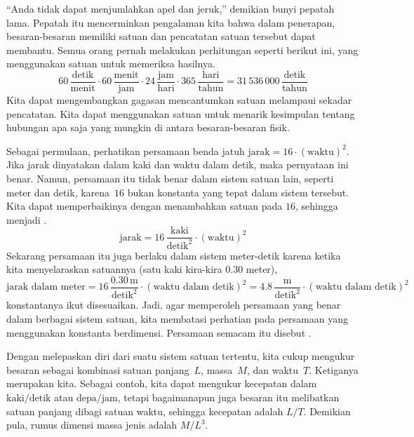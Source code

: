 ``Anda tidak dapat menjumlahkan apel dan jeruk,'' demikian bunyi pepatah lama.
Pepatah itu mencerminkan pengalaman kita bahwa dalam penerapan, besaran-besaran
memiliki satuan dan pencatatan satuan tersebut dapat membantu.
Semua orang pernah melakukan perhitungan seperti berikut ini,
yang menggunakan satuan untuk memeriksa hasilnya.
\begin{equation*}
  60\,\frac{\text{detik}}{\text{menit}}
  \cdot 60\,\frac{\text{menit}}{\text{jam}}
  \cdot 24\,\frac{\text{jam}}{\text{hari}}
  \cdot 365\,\frac{\text{hari}}{\text{tahun}}
  = 31\,536\,000\,\frac{\text{detik}}{\text{tahun}}
\end{equation*}
Kita dapat mengembangkan gagasan mencantumkan satuan melampaui sekadar pencatatan.
Kita dapat menggunakan satuan untuk menarik kesimpulan
tentang hubungan apa saja yang mungkin di antara besaran-besaran fisik.

Sebagai permulaan, perhatikan persamaan benda jatuh
$\text{jarak}=16\cdot(\text{waktu})^2$.
Jika jarak dinyatakan dalam kaki dan waktu dalam detik, maka pernyataan ini
benar.
Namun, persamaan itu tidak benar dalam sistem satuan lain, seperti meter dan detik,
karena~$16$ bukan konstanta yang
tepat dalam sistem tersebut.
Kita dapat memperbaikinya dengan menambahkan satuan pada $16$, sehingga menjadi
.
\begin{equation*}
  \text{jarak}=16\,\frac{\text{kaki}}{\text{detik}^2}\cdot (\text{waktu})^2
\end{equation*}  
Sekarang persamaan itu juga berlaku dalam sistem meter-detik
karena ketika kita menyelaraskan satuannya (satu kaki kira-kira $0.30$ meter),
\begin{equation*}
  \text{jarak dalam meter}=16\,\frac{0.30\,\text{m}}{\text{detik}^2}
                    \cdot (\text{waktu dalam detik})^2
                   =4.8\,\frac{\text{m}}{\text{detik}^2}
                    \cdot (\text{waktu dalam detik})^2
\end{equation*}
konstantanya ikut disesuaikan.
Jadi, agar memperoleh persamaan yang benar dalam berbagai sistem satuan,
kita membatasi perhatian
pada persamaan yang menggunakan konstanta berdimensi.
Persamaan semacam itu disebut .

Dengan melepaskan diri dari suatu sistem satuan tertentu, kita cukup
mengukur besaran sebagai kombinasi
satuan panjang~$L$, massa~$M$, dan waktu~$T$.
Ketiganya merupakan
 kita.
Sebagai contoh, kita dapat mengukur kecepatan
dalam $\text{kaki}/\text{detik}$
atau $\text{depa}/\text{jam}$, tetapi bagaimanapun juga besaran itu melibatkan
satuan panjang dibagi satuan waktu,
sehingga 
kecepatan adalah $L/T$.
Demikian pula, rumus dimensi massa jenis adalah $M/L^3$.

